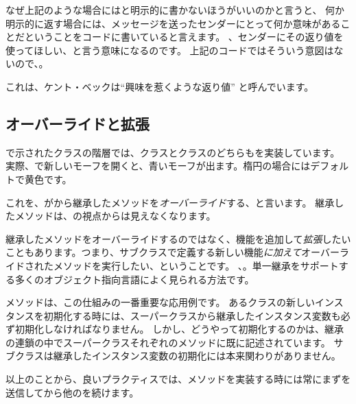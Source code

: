 \documentclass[a4paper,10pt,twoside]{book}
\begin{document}
なぜ上記のような場合にはと明示的に書かないほうがいいのかと言うと、
何か明示的に返す場合には、メッセージを送ったセンダーにとって何か意味があることだということをコードに書いていると言えます。
、センダーにその返り値を使ってほしい、と言う意味になるのです。
上記のコードではそういう意図はないので、。

これは、ケント・ベックは``興味を惹くような返り値'' \cite{Beck97a} と呼んでいます。


\subsection{オーバーライドと拡張}

で示されたクラスの階層では、クラスと\mbox{}クラスのどちらもを実装しています。
実際、で新しいモーフを開くと、青いモーフが出ます。楕円の場合にはデフォルトで黄色です。

これを、がから継承したメソッドを\emph{オーバーライド}する、と言います。
継承したメソッドは、の視点からは見えなくなります。

継承したメソッドをオーバーライドするのではなく、機能を追加して\emph{拡張}したいこともあります。つまり、サブクラスで定義する新しい機能\emph{に加えて}オーバーライドされたメソッドを実行したい、ということです。
、。単一継承をサポートする多くのオブジェクト指向言語によく見られる方法です。

メソッドは、この仕組みの一番重要な応用例です。
あるクラスの新しいインスタンスを初期化する時には、スーパークラスから継承したインスタンス変数も必ず初期化しなければなりません。
しかし、どうやって初期化するのかは、継承の連鎖の中でスーパークラスそれぞれのメソッドに既に記述されています。
サブクラスは継承したインスタンス変数の初期化には本来関わりがありません。

以上のことから、良いプラクティスでは、メソッドを実装する時には常にまずを送信してから他のを続けます。
\end{document}
